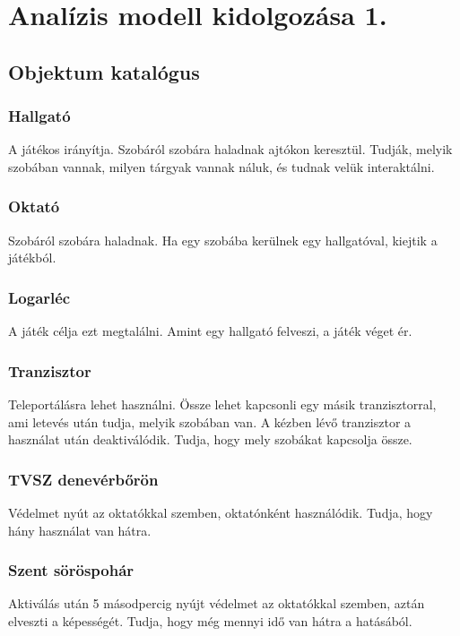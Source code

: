 \chapter{Analízis modell kidolgozása 1.}

\section{Objektum katalógus}

\subsection{Hallgató}
A játékos irányítja. Szobáról szobára haladnak ajtókon keresztül. Tudják, melyik szobában vannak, milyen tárgyak vannak náluk, és tudnak velük interaktálni.

\subsection{Oktató}
Szobáról szobára haladnak. Ha egy szobába kerülnek egy hallgatóval, kiejtik a játékból. 

\subsection{Logarléc}
A játék célja ezt megtalálni. Amint egy hallgató felveszi, a játék véget ér.

\subsection{Tranzisztor}
Teleportálásra lehet használni. Össze lehet kapcsonli egy másik tranzisztorral, ami letevés után tudja, melyik szobában van. A kézben lévő tranzisztor a használat után deaktiválódik. Tudja, hogy mely szobákat kapcsolja össze.

\subsection{TVSZ denevérbőrön}
Védelmet nyút az oktatókkal szemben, oktatónként használódik. Tudja, hogy hány használat van hátra.

\subsection{Szent söröspohár}
Aktiválás után 5 másodpercig nyújt védelmet az oktatókkal szemben, aztán  elveszti a képességét. Tudja, hogy még mennyi idő van hátra a hatásából.

